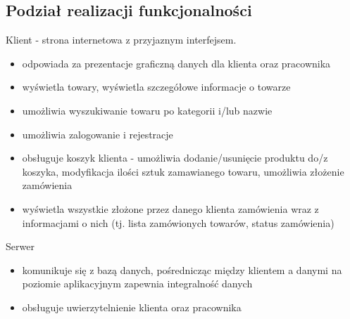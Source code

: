 \documentclass[10pt,a4paper]{article}
\begin{document}
\subsection{Podział realizacji funkcjonalności}
Klient - strona internetowa z przyjaznym interfejsem.
\begin{itemize}
\item odpowiada za prezentacje graficzną danych dla klienta oraz pracownika
\item wyświetla towary, wyświetla szczegółowe informacje o towarze
\item umożliwia wyszukiwanie towaru po kategorii i/lub nazwie
\item umożliwia zalogowanie i rejestracje
\item obsługuje koszyk klienta - umożliwia dodanie/usunięcie produktu do/z koszyka, modyfikacja ilości sztuk zamawianego towaru, umożliwia złożenie zamówienia 
\item wyświetla wszystkie złożone przez danego klienta zamówienia wraz z informacjami o nich (tj. lista zamówionych towarów, status zamówienia)
\end{itemize}
Serwer
\begin{itemize}
\item komunikuje się z bazą danych, pośrednicząc między klientem a danymi
na poziomie aplikacyjnym zapewnia integralność danych
\item obsługuje uwierzytelnienie klienta oraz pracownika
\end{itemize}
\newpage
\end{document}
